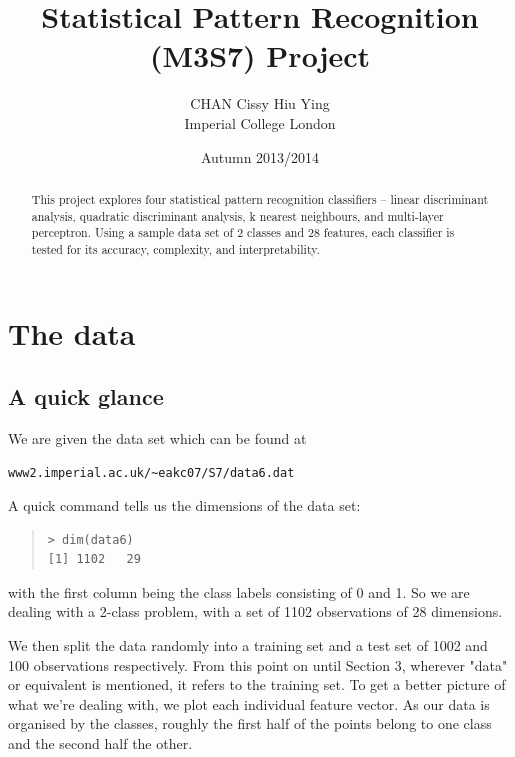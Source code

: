\documentclass[11pt, a4paper]{article}
\title{Statistical Pattern Recognition (M3S7) Project}
\author{CHAN Cissy Hiu Ying \\ Imperial College London}
\date{Autumn 2013/2014}
\begin{document}
\vspace*{4cm}
{\let\newpage\relax\maketitle}
\newpage

\newpage
\tableofcontents

\newpage

\begin{abstract}
This project explores four statistical pattern recognition classifiers -- linear discriminant analysis, quadratic discriminant analysis, k nearest neighbours, and multi-layer perceptron. Using a sample data set of 2 classes and 28 features, each classifier is tested for its accuracy, complexity, and interpretability.

\end{abstract}

\newpage

\section{The data}
\subsection{A quick glance}

We are given the data set which can be found at
\begin{verbatim}
www2.imperial.ac.uk/~eakc07/S7/data6.dat
\end{verbatim}

A quick command tells us the dimensions of the data set:

\begin{quote}
\begin{verbatim}
> dim(data6)
[1] 1102   29
\end{verbatim}
\end{quote}

with the first column being the class labels consisting of 0 and 1. So we are dealing with a 2-class problem, with a set of 1102 observations of 28 dimensions.

We then split the data randomly into a training set and a test set of 1002 and 100 observations respectively. From this point on until Section 3, wherever "data" or equivalent is mentioned, it refers to the training set. To get a better picture of what we're dealing with, we plot each individual feature vector. As our data is organised by the classes, roughly the first half of the points belong to one class and the second half the other.
\end{document}

